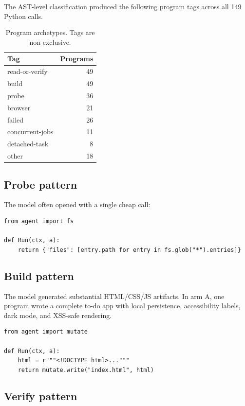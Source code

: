\documentclass[11pt]{article}
\begin{document}
The AST-level classification produced the following program tags across all
149 Python calls.

\begin{table}[h]
\centering
\begin{tabular}{lr}
\toprule
\textbf{Tag} & \textbf{Programs} \\
\midrule
read-or-verify & 49 \\
build & 49 \\
probe & 36 \\
browser & 21 \\
failed & 26 \\
concurrent-jobs & 11 \\
detached-task & 8 \\
other & 18 \\
\bottomrule
\end{tabular}
\caption{Program archetypes.  Tags are non-exclusive.}
\end{table}

\subsection{Probe pattern}

The model often opened with a single cheap call:

\begin{lstlisting}[style=python]
from agent import fs

def Run(ctx, a):
    return {"files": [entry.path for entry in fs.glob("*").entries]}
\end{lstlisting}

\subsection{Build pattern}

The model generated substantial HTML/CSS/JS artifacts.  In arm A, one program
wrote a complete to-do app with local persistence, accessibility labels, dark
mode, and XSS-safe rendering.

\begin{lstlisting}[style=python]
from agent import mutate

def Run(ctx, a):
    html = r"""<!DOCTYPE html>..."""
    return mutate.write("index.html", html)
\end{lstlisting}

\subsection{Verify pattern}
\end{document}

